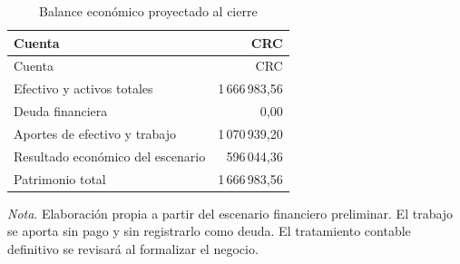 \begin{longtable}{lr}
\caption{Balance económico proyectado al cierre}\\
\toprule
Cuenta & CRC \\
\midrule
\endfirsthead
\toprule
Cuenta & CRC \\
\midrule
\endhead
Efectivo y activos totales & 1\,666\,983,56 \\
Deuda financiera & 0,00 \\
Aportes de efectivo y trabajo & 1\,070\,939,20 \\
Resultado económico del escenario & 596\,044,36 \\
Patrimonio total & 1\,666\,983,56 \\
\bottomrule
\end{longtable}
{\small\textit{Nota}. Elaboración propia a partir del escenario financiero preliminar. El trabajo se aporta sin pago y sin registrarlo como deuda. El tratamiento contable definitivo se revisará al formalizar el negocio.}
